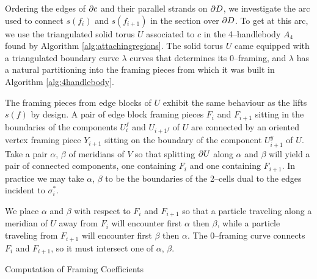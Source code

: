 Ordering the edges of $\partial c$ and their parallel strands on $\partial D$, we investigate the arc used to connect $s(f_i)$ and $s(f_{i+1})$ in the section over $\partial D$.
To get at this arc, we use the triangulated solid torus $U$ associated to $c$ in the 4--handlebody $A_4$ found by Algorithm \ref{alg:attachingregions}.
The solid torus $U$ came equipped with a triangulated boundary curve $\lambda$ curves that determines its 0--framing, and $\lambda$ has a natural partitioning into the framing pieces from which it was built in Algorithm \ref{alg:4handlebody}.

The framing pieces from edge blocks of $U$ exhibit the same behaviour as the lifts $s(f)$ by design.
A pair of edge block framing pieces $F_i$ and $F_{i+1}$ sitting in the boundaries of the components $U_i^f$ and $U_{i+1^f}$ of $U$ are connected by an oriented vertex framing piece $Y_{i+1}$ sitting on the boundary of the component $U_{i+1}^y$ of $U$.
Take a pair $\alpha$, $\beta$ of meridians of $V$ so that splitting $\partial U$ along $\alpha$ and $\beta$ will yield a pair of connected components, one containing $F_i$ and one containing $F_{i+1}$.
In practice we may take $\alpha$, $\beta$ to be the boundaries of the 2--cells dual to the edges incident to $\sigma_i^*$.

We place $\alpha$ and $\beta$ with respect to $F_i$ and $F_{i+1}$ so that a particle traveling along a meridian of $U$ away from $F_i$ will encounter first $\alpha$ then $\beta$, while a particle traveling from $F_{i+1}$ will encounter first $\beta$ then $\alpha$.
The 0--framing curve connects $F_i$ and $F_{i+1}$, so it must intersect one of $\alpha$, $\beta$.

\begin{algorithm}
	\caption{Computation of Framing Coefficients}
	\label{alg:gleams}
\end{algorithm}